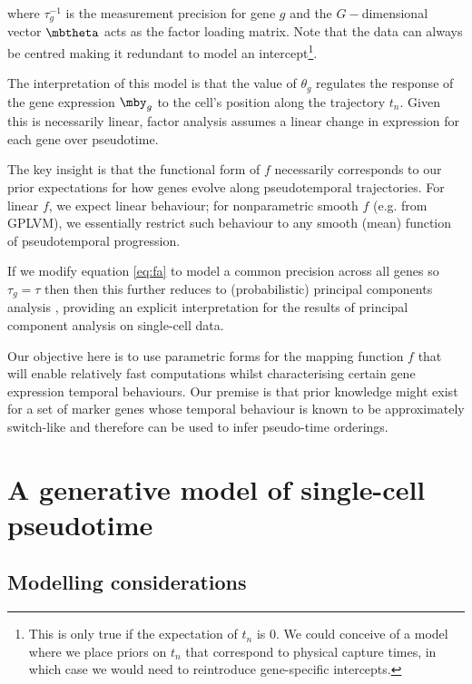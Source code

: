 where $\tau_g^{-1}$ is the measurement precision for gene $g$ and the $G-$dimensional vector $\mbtheta$ acts as the factor loading matrix. Note that the data can always be centred making it redundant to model an intercept\footnote{This is only true if the expectation of $t_n$ is 0. We could conceive of a model where we place priors on $t_n$ that correspond to physical capture times, in which case we would need to reintroduce gene-specific intercepts.}.

The interpretation of this model is that the value of $\theta_g$ regulates the response of the gene expression $\mby_{g}$ to the cell's position along the trajectory $t_n$. Given this is necessarily linear, factor analysis assumes a linear change in expression for each gene over pseudotime.

The key insight is that the functional form of $f$ necessarily corresponds to our prior expectations for how genes evolve along pseudotemporal trajectories. For linear $f$, we expect linear behaviour; for nonparametric smooth $f$ (e.g. from GPLVM), we essentially restrict such behaviour to any smooth (mean) function of pseudotemporal progression.

If we modify equation \ref{eq:fa} to model a common precision across all genes so $\tau_g = \tau$ then then this further reduces to
(probabilistic) principal components analysis \cite{tipping1999probabilistic}, providing an explicit interpretation for the results of principal component analysis on single-cell data.

Our objective here is to use parametric forms for the mapping function $f$ that will enable relatively fast computations whilst characterising certain gene expression temporal behaviours. Our premise is that prior knowledge might exist for a set of marker genes whose temporal behaviour is known to be approximately switch-like and therefore can be used to infer pseudo-time orderings.



\section{A generative model of single-cell pseudotime}

\subsection{Modelling considerations}

